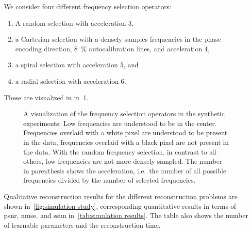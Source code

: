 We consider four different frequency selection operators:
\begin{enumerate}
	\item A random selection with acceleration \num{3},
	\item a Cartesian selection with a densely samples frequencies in the phase encoding direction, \qty{8}{\percent} autocalibration lines, and acceleration \num{4},
	\item a spiral selection with acceleration \num{5}, and
	\item a radial selection with acceleration \num{6}.
\end{enumerate}
These are visualized in in~\cref{fig:simulation study masks}.
\begin{figure}
	\centering
	\caption[Frequency selection in the synthtetic experiments]{%
		A visualization of the frequency selection operators in the synthetic experiments:
		Low frequencies are understood to be in the center.
		Frequencies overlaid with a white pixel are understood to be present in the data, frequencies overlaid with a black pixel are not present in the data.
		With the random frequency selection, in contrast to all others, low frequencies are not more densely sampled.
		The number in parenthesis shows the acceleration, i.e.\ the number of all possible frequencies divided by the number of selected frequencies.
	}
	\label{fig:simulation study masks}
\end{figure}

Qualitative reconstruction results for the different reconstruction problems are shown in~\cref{fig:simulation study}, corresponding quantitative results in terms of \gls{psnr}, \gls{nmse}, and \gls{ssim} in~\cref{tab:simulation results}.
The table also shows the number of learnable parameters and the reconstruction time.

